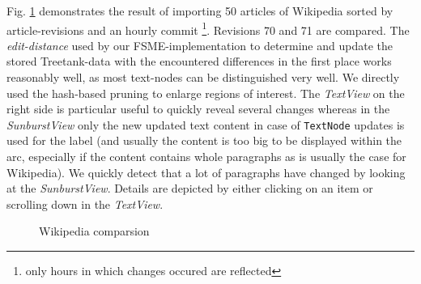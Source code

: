 Fig. \ref{fig:wikivis} demonstrates the result of importing 50 articles of Wikipedia sorted by article-revisions and an hourly commit \footnote{only hours in which changes occured are reflected}. Revisions 70 and 71 are compared. The \emph{edit-distance} used by our FSME-implementation to determine and update the stored Treetank-data with the encountered differences in the first place works reasonably well, as most text-nodes can be distinguished very well. We directly used the hash-based pruning to enlarge regions of interest. The \emph{TextView} on the right side is particular useful to quickly reveal several changes whereas in the \emph{SunburstView} only the new updated text content in case of \texttt{TextNode} updates is used for the label (and usually the content is too big to be displayed within the arc, especially if the content contains whole paragraphs as is usually the case for Wikipedia). We quickly detect that a lot of paragraphs have changed by looking at the \emph{SunburstView}. Details are depicted by either clicking on an item or scrolling down in the \emph{TextView}. %

\begin{figure}[htb]
\caption{\label{fig:wikivis} Wikipedia comparsion}
\end{figure}

